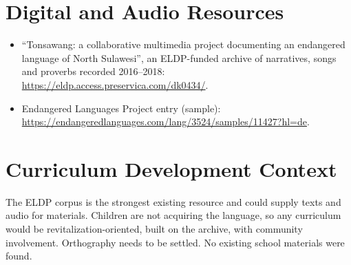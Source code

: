 \documentclass[12pt]{article}
\begin{document}
\section{Digital and Audio Resources}
\begin{itemize}
\item ``Tonsawang: a collaborative multimedia project documenting an endangered language of North Sulawesi'', an ELDP-funded archive of narratives, songs and proverbs recorded 2016--2018: \url{https://eldp.access.preservica.com/dk0434/}.
\item Endangered Languages Project entry (sample): \url{https://endangeredlanguages.com/lang/3524/samples/11427?hl=de}.
\end{itemize}

\section{Curriculum Development Context}
The ELDP corpus is the strongest existing resource and could supply texts and audio for materials. Children are not acquiring the language, so any curriculum would be revitalization-oriented, built on the archive, with community involvement. Orthography needs to be settled. No existing school materials were found.
\end{document}
